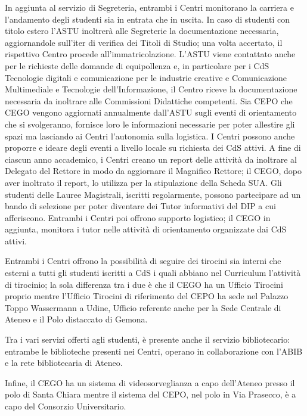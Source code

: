                 In aggiunta al servizio di Segreteria, entrambi i Centri monitorano la carriera e l'andamento degli studenti sia in entrata che in uscita. In caso di studenti con titolo estero l'ASTU inoltrerà alle Segreterie la documentazione necessaria, aggiornandole sull'iter di verifica dei Titoli di Studio; una volta accertato, il rispettivo Centro procede all'immatricolazione. L'ASTU viene contattato anche per le richieste delle domande di equipollenza e, in particolare per i CdS Tecnologie digitali e comunicazione per le industrie creative e Comunicazione Multimediale e Tecnologie dell'Informazione, il Centro riceve la documentazione necessaria da inoltrare alle Commissioni Didattiche competenti. \newline
                Sia CEPO che CEGO vengono aggiornati annualmente dall'ASTU sugli eventi di orientamento che si svolgeranno, fornisce loro le informazioni necessarie per poter allestire gli spazi ma lasciando ai Centri l'autonomia sulla logistica. I Centri possono anche proporre e ideare degli eventi a livello locale su richiesta dei CdS attivi. A fine di ciascun anno accademico, i Centri creano un report delle attività da inoltrare al Delegato del Rettore in modo da aggiornare il Magnifico Rettore; il CEGO, dopo aver inoltrato il report, lo utilizza per la stipulazione della Scheda SUA. \newline
                Gli studenti delle Lauree Magistrali, iscritti regolarmente, possono partecipare ad un bando di selezione per poter diventare dei Tutor informativi del DIP a cui afferiscono. Entrambi i Centri poi offrono supporto logistico; il CEGO in aggiunta, monitora i tutor nelle attività di orientamento organizzate dai CdS attivi. 
            \par
                Entrambi i Centri offrono la possibilità di seguire dei tirocini sia interni che esterni a tutti gli studenti iscritti a CdS i quali abbiano nel Curriculum l'attività di tirocinio; la sola differenza tra i due è che il CEGO ha un Ufficio Tirocini proprio mentre l'Ufficio Tirocini di riferimento del CEPO ha sede nel Palazzo Toppo Wassermann a Udine, Ufficio referente anche per la Sede Centrale di Ateneo e il Polo distaccato di Gemona.
            \par
                Tra i vari servizi offerti agli studenti, è presente anche il servizio bibliotecario: entrambe le biblioteche presenti nei Centri, operano in collaborazione con l'ABIB e la rete bibliotecaria di Ateneo.
            \par
                Infine, il CEGO ha un sistema di videosorveglianza a capo dell'Ateneo presso il polo di Santa Chiara mentre il sistema del CEPO, nel polo in Via Prasecco, è a capo del Consorzio Universitario. \newline

